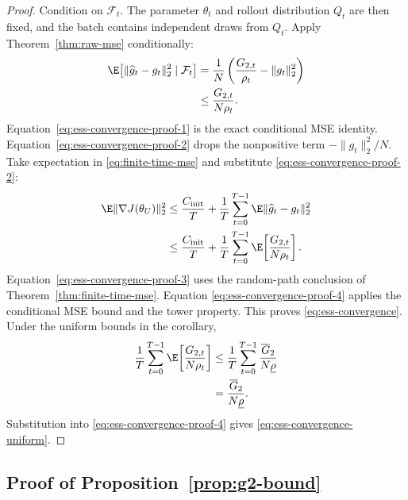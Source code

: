 \begin{proof}
Condition on $\mathcal F_t$.  The parameter $\theta_t$ and rollout distribution
$Q_t$ are then fixed, and the batch contains independent draws from $Q_t$.
Apply Theorem~\ref{thm:raw-mse} conditionally:
\begin{align}
  \E\!\left[\|\widehat g_t-g_t\|_2^2\mid\mathcal F_t\right]
  &=\frac1N\left(
    \frac{G_{2,t}}{\rho_t}-\|g_t\|_2^2
  \right)
    \label{eq:ess-convergence-proof-1}\\
  &\le\frac{G_{2,t}}{N\rho_t}.
    \label{eq:ess-convergence-proof-2}
\end{align}
Equation~\eqref{eq:ess-convergence-proof-1} is the exact conditional MSE
identity.  Equation~\eqref{eq:ess-convergence-proof-2} drops the nonpositive
term $-\|g_t\|_2^2/N$.  Take expectation in
\eqref{eq:finite-time-mse} and substitute
\eqref{eq:ess-convergence-proof-2}:
\begin{align}
  \E\|\nabla J(\theta_U)\|_2^2
  &\le\frac{C_{\mathrm{init}}}{T}
    +\frac1T\sum_{t=0}^{T-1}
      \E\|\widehat g_t-g_t\|_2^2
    \label{eq:ess-convergence-proof-3}\\
  &\le\frac{C_{\mathrm{init}}}{T}
    +\frac1T\sum_{t=0}^{T-1}
      \E\!\left[\frac{G_{2,t}}{N\rho_t}\right].
    \label{eq:ess-convergence-proof-4}
\end{align}
Equation~\eqref{eq:ess-convergence-proof-3} uses the random-path conclusion of
Theorem~\ref{thm:finite-time-mse}.  Equation
\eqref{eq:ess-convergence-proof-4} applies the conditional MSE bound and the
tower property.  This proves \eqref{eq:ess-convergence}.  Under the uniform
bounds in the corollary,
\begin{align}
  \frac1T\sum_{t=0}^{T-1}
    \E\!\left[\frac{G_{2,t}}{N\rho_t}\right]
  &\le\frac1T\sum_{t=0}^{T-1}
    \frac{\overline G_2}{N\underline\rho}
    \label{eq:ess-convergence-proof-5}\\
  &=\frac{\overline G_2}{N\underline\rho}.
    \label{eq:ess-convergence-proof-6}
\end{align}
Substitution into \eqref{eq:ess-convergence-proof-4} gives
\eqref{eq:ess-convergence-uniform}.
\end{proof}

\subsection{Proof of Proposition~\ref{prop:g2-bound}}

